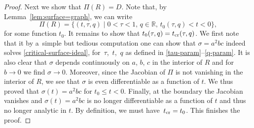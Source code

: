 \documentclass[pdftex]{sigma}
\numberwithin{equation}{section}
\begin{document}
\begin{proof}
Next we show that $\Pi(R)=D$. Note that, by Lemma~\ref{lem:surface=graph}, we can write
\[
\Pi(R)=\{(t,\tau,q) \mid 0<\tau<1,\, q \in \mathbb R,\, t_0(\tau,q)< t <0\},
\]
for some function $t_0$. It remains to show that $t_0(\tau,q)=t_{\rm cr}(\tau,q)$. We first note that it by a~simple but tedious computation one can show that $\sigma=a^2bc$ indeed solves \eqref{critical-surface-ideal}, for~$\tau$,~$t$,~$q$ as defined in \eqref{tau-param}--\eqref{q-param}. It is also clear that $\sigma$ depends continuously on $a$, $b$, $c$ in the interior of $R$ and for~${b\to 0}$ we find $\sigma\to 0$. Moreover, since the Jacobian of $\Pi$ is not vanishing in the interior of $R$, we see that $\sigma$ is even differentiable as a function of $t$. We thus proved that $\sigma(t)=a^2bc$ for $t_0 \leq t <0$. Finally, at the boundary the Jacobian vanishes and $\sigma(t)=a^2bc$ is no longer differentiable as a function of $t$ and thus no longer analytic in $t$. By definition, we must have~${t_{\rm cr}=t_0}$. This finishes the proof.
\end{proof}
\end{document}
